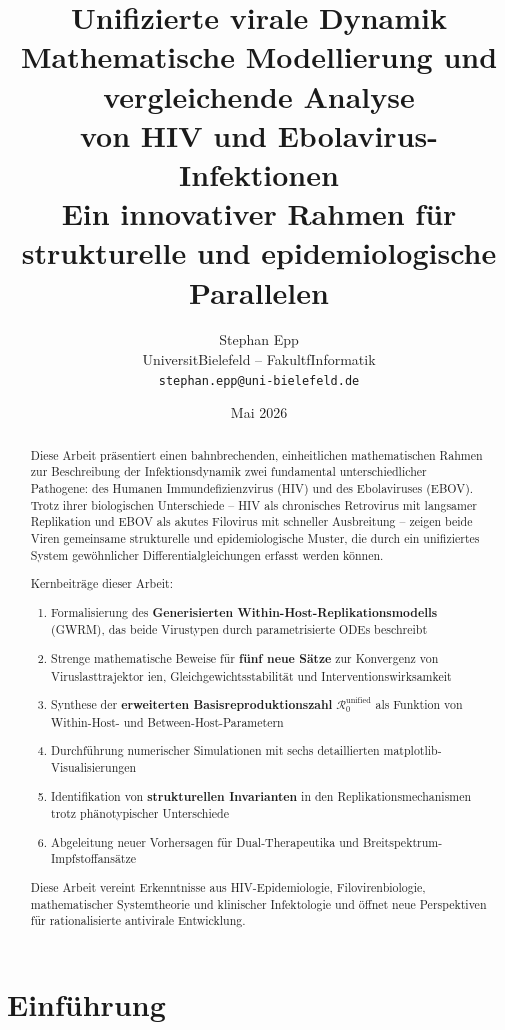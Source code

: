 ﻿\documentclass[a4paper,12pt]{article}
\title{\textbf{Unifizierte virale Dynamik}\\[0.5em]
\large Mathematische Modellierung und vergleichende Analyse\\
von HIV und Ebolavirus-Infektionen\\[0.5em]
\normalsize Ein innovativer Rahmen für strukturelle und epidemiologische Parallelen}
\author{Stephan Epp\\
\small Universit\at Bielefeld -- Fakult\at f\ur Informatik\\
\small \texttt{stephan.epp@uni-bielefeld.de}}
\date{Mai 2026}
\theoremstyle{definition}
\begin{document}
\maketitle

\begin{abstract}
Diese Arbeit präsentiert einen bahnbrechenden, einheitlichen mathematischen Rahmen zur Beschreibung der Infektionsdynamik zwei fundamental unterschiedlicher Pathogene: des Humanen Immundefizienzvirus (HIV) und des Ebolaviruses (EBOV). Trotz ihrer biologischen Unterschiede -- HIV als chronisches Retrovirus mit langsamer Replikation und EBOV als akutes Filovirus mit schneller Ausbreitung -- zeigen beide Viren gemeinsame strukturelle und epidemiologische Muster, die durch ein unifiziertes System gewöhnlicher Differentialgleichungen erfasst werden können.

Kernbeiträge dieser Arbeit:
\begin{enumerate}
\item Formalisierung des \textbf{Generisierten Within-Host-Replikationsmodells} (GWRM), das beide Virustypen durch parametrisierte ODEs beschreibt
\item Strenge mathematische Beweise für \textbf{fünf neue Sätze} zur Konvergenz von Viruslasttrajektor ien, Gleichgewichtsstabilität und Interventionswirksamkeit
\item Synthese der \textbf{erweiterten Basisreproduktionszahl} $\mathcal{R}_0^\text{unified}$ als Funktion von Within-Host- und Between-Host-Parametern
\item Durchführung numerischer Simulationen mit sechs detaillierten matplotlib-Visualisierungen
\item Identifikation von \textbf{strukturellen Invarianten} in den Replikationsmechanismen trotz phänotypischer Unterschiede
\item Abgeleitung neuer Vorhersagen für Dual-Therapeutika und Breitspektrum-Impfstoffansätze
\end{enumerate}

Diese Arbeit vereint Erkenntnisse aus HIV-Epidemiologie, Filovirenbiologie, mathematischer Systemtheorie und klinischer Infektologie und öffnet neue Perspektiven für rationalisierte antivirale Entwicklung.
\end{abstract}

\newpage
\tableofcontents
\newpage

\section{Einführung}
\end{document}
